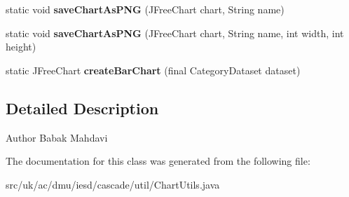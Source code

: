 \begin{DoxyCompactItemize}
\item 
\hypertarget{classuk_1_1ac_1_1dmu_1_1iesd_1_1cascade_1_1util_1_1_chart_utils_a0fdd614b29d80c6b408c66adaa726fbc}{static void {\bfseries save\-Chart\-As\-P\-N\-G} (J\-Free\-Chart chart, String name)}\label{classuk_1_1ac_1_1dmu_1_1iesd_1_1cascade_1_1util_1_1_chart_utils_a0fdd614b29d80c6b408c66adaa726fbc}

\item 
\hypertarget{classuk_1_1ac_1_1dmu_1_1iesd_1_1cascade_1_1util_1_1_chart_utils_af7f1b533bda5f9d780c7cf28b28676d5}{static void {\bfseries save\-Chart\-As\-P\-N\-G} (J\-Free\-Chart chart, String name, int width, int height)}\label{classuk_1_1ac_1_1dmu_1_1iesd_1_1cascade_1_1util_1_1_chart_utils_af7f1b533bda5f9d780c7cf28b28676d5}

\item 
\hypertarget{classuk_1_1ac_1_1dmu_1_1iesd_1_1cascade_1_1util_1_1_chart_utils_a2418889de1748079379e790da95f174a}{static J\-Free\-Chart {\bfseries create\-Bar\-Chart} (final Category\-Dataset dataset)}\label{classuk_1_1ac_1_1dmu_1_1iesd_1_1cascade_1_1util_1_1_chart_utils_a2418889de1748079379e790da95f174a}

\end{DoxyCompactItemize}


\subsection{Detailed Description}
\begin{DoxyAuthor}{Author}
Babak Mahdavi 
\end{DoxyAuthor}


The documentation for this class was generated from the following file\-:\begin{DoxyCompactItemize}
\item 
src/uk/ac/dmu/iesd/cascade/util/Chart\-Utils.\-java\end{DoxyCompactItemize}
